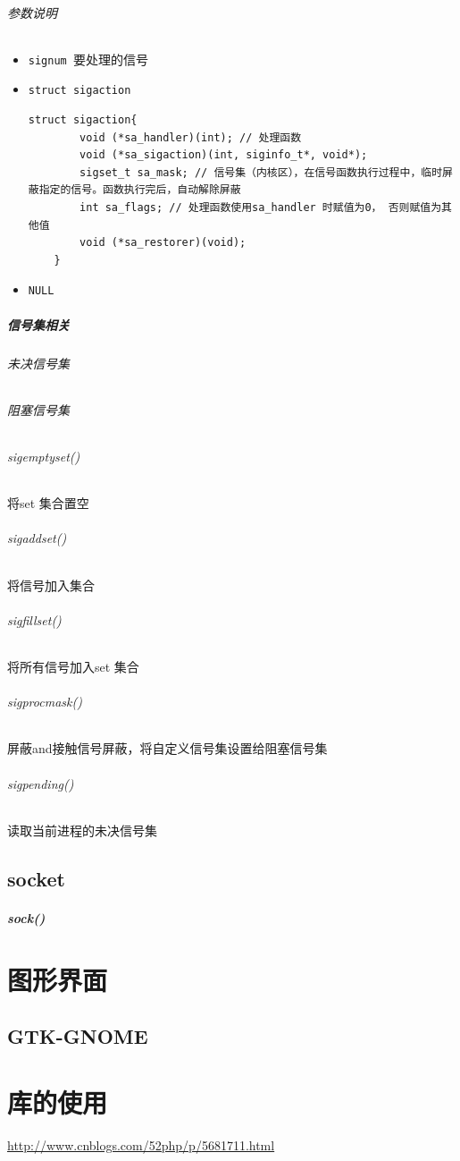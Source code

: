 \documentclass[UTF8,a4paper,12pt]{ctexbook}
\begin{document}
			\subparagraph{参数说明}
				\begin{itemize}[itemindent =1em]
					\item \verb|signum |要处理的信号
					\item \verb|struct sigaction |
						\begin{lstlisting}[frame = L, xleftmargin = .07\textwidth]
	struct sigaction{
		void (*sa_handler)(int); // 处理函数
		void (*sa_sigaction)(int, siginfo_t*, void*);
		sigset_t sa_mask; // 信号集（内核区），在信号函数执行过程中，临时屏蔽指定的信号。函数执行完后，自动解除屏蔽
		int sa_flags; // 处理函数使用sa_handler 时赋值为0， 否则赋值为其他值
		void (*sa_restorer)(void);
	}
						\end{lstlisting}
					\item \verb|NULL|
				\end{itemize}	
		
		\paragraph{信号集相关}
			\subparagraph{未决信号集}
			
			\subparagraph{阻塞信号集}
			
			\subparagraph{sigemptyset()} 将set 集合置空
			
			\subparagraph{sigaddset()} 将信号加入集合
			
			\subparagraph{sigfillset()} 将所有信号加入set 集合
			
			\subparagraph{sigprocmask()} 屏蔽and接触信号屏蔽，将自定义信号集设置给阻塞信号集
			
			\subparagraph{sigpending()} 读取当前进程的未决信号集
	
			
	\section{socket}
		\paragraph{sock()}


\chapter{图形界面}
	\section{GTK-GNOME}
	
		
\chapter{库的使用}
	\url{http://www.cnblogs.com/52php/p/5681711.html}
\end{document}
